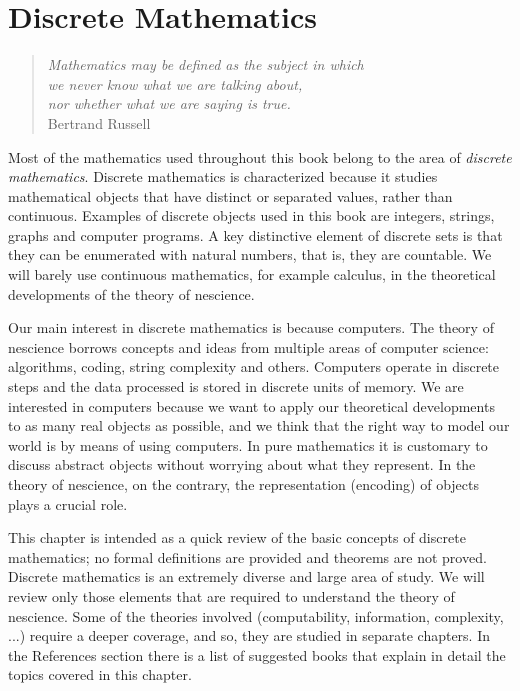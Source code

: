 %
%


\chapter{Discrete Mathematics}
\label{chap:Discrete_Mathematics}

\begin{quote}
\begin{flushright}
\emph{Mathematics may be defined as the subject in which\\
we never know what we are talking about,\\
nor whether what we are saying is true.}\\
Bertrand Russell
\end{flushright}
\end{quote}
\bigskip

Most of the mathematics used throughout this book belong to the area of \emph{discrete mathematics}. Discrete mathematics is characterized because it studies mathematical objects that have distinct or separated values, rather than continuous. Examples of discrete objects used in this book are integers, strings, graphs and computer programs. A key distinctive element of discrete sets is that they can be enumerated with natural numbers, that is, they are countable. We will barely use continuous mathematics, for example calculus, in the theoretical developments of the theory of nescience.

Our main interest in discrete mathematics is because computers. The theory of nescience borrows concepts and ideas from multiple areas of computer science: algorithms, coding, string complexity and others. Computers operate in discrete steps and the data processed is stored in discrete units of memory. We are interested in computers because we want to apply our theoretical developments to as many real objects as possible, and we think that the right way to model our world is by means of using computers. In pure mathematics it is customary to discuss abstract objects without worrying about what they represent. In the theory of nescience, on the contrary, the representation (encoding) of objects plays a crucial role.

This chapter is intended as a quick review of the basic concepts of discrete mathematics; no formal definitions are provided and theorems are not proved. Discrete mathematics is an extremely diverse and large area of study. We will review only those elements that are required to understand the theory of nescience. Some of the theories involved (computability, information, complexity, ...) require a deeper coverage, and so, they are studied in separate chapters. In the References section there is a list of suggested books that explain in detail the topics covered in this chapter.

